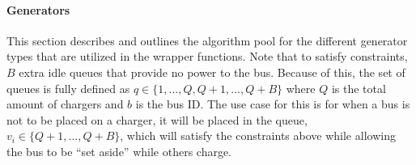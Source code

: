 \documentclass[ee,msthesis]{usuthesis}
\begin{document}
\paragraph{Generators}
\label{sec:generators}
This section describes and outlines the algorithm pool for the different generator types that are utilized in the
wrapper functions. Note that to satisfy constraints, \(B\) extra idle queues that provide no power to the bus. Because of
this, the set of queues is fully defined as \(q \in \{1,..., Q, Q+1,..., Q+B\}\) where \(Q\) is the total amount of chargers
and \(b\) is the bus ID. The use case for this is for when a bus is not to be placed on a charger, it will be placed in
the queue, \(v_i \in \{Q+1,..., Q+B\}\), which will satisfy the constraints above while allowing the bus to be ``set aside''
while others charge.
\end{document}
